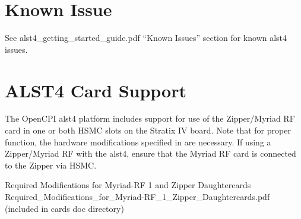 \documentclass{article}
\begin{document}
\section*{Known Issue}
See alst4\_getting\_started\_guide.pdf ``Known Issues'' section for known alst4 issues.
\section*{ALST4 Card Support}
The OpenCPI alst4 platform includes support for use of the Zipper/Myriad RF card in one or both HSMC slots on the Stratix IV board. Note that for proper function, the hardware modifications specified in \cite{zipper_mods} are necessary. If using a Zipper/Myriad RF with the alst4, ensure that the Myriad RF card is connected to the Zipper via HSMC.

\pagebreak
  \begin{thebibliography}{1}

   Required Modifications for Myriad-RF 1 and Zipper Daughtercards\\
	 Required\_Modifications\_for\_Myriad-RF\_1\_Zipper\_Daughtercards.pdf (included in cards doc directory)

  \end{thebibliography}
\end{document}
